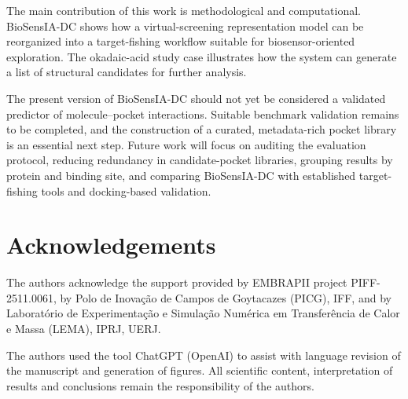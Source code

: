 \documentclass[12pt,fleqn]{article}
\begin{document}
The main contribution of this work is methodological and
computational. BioSensIA-DC shows how a virtual-screening
representation model can be reorganized into a target-fishing workflow
suitable for biosensor-oriented exploration. The okadaic-acid study
case illustrates how the system can generate a list of structural
candidates for further analysis.

The present version of BioSensIA-DC should not yet be considered a
validated predictor of molecule--pocket interactions. Suitable
benchmark validation remains to be completed, and the construction of
a curated, metadata-rich pocket library is an essential next step.
Future work will focus on auditing the evaluation protocol, reducing
redundancy in candidate-pocket libraries, grouping results by protein
and binding site, and comparing BioSensIA-DC with established
target-fishing tools and docking-based validation.


\section*{Acknowledgements}

The authors acknowledge the support provided by EMBRAPII project
PIFF-2511.0061, by Polo de Inovação de Campos de Goytacazes (PICG),
IFF, and by Laboratório de Experimentação e Simulação Numérica em
Transferência de Calor e Massa (LEMA), IPRJ, UERJ.

The authors used the tool ChatGPT (OpenAI) to assist with language
revision of the manuscript and generation of figures. All scientific
content, interpretation of results and conclusions remain the
responsibility of the authors.



\fontsize{11}{0}\selectfont

\end{document}
